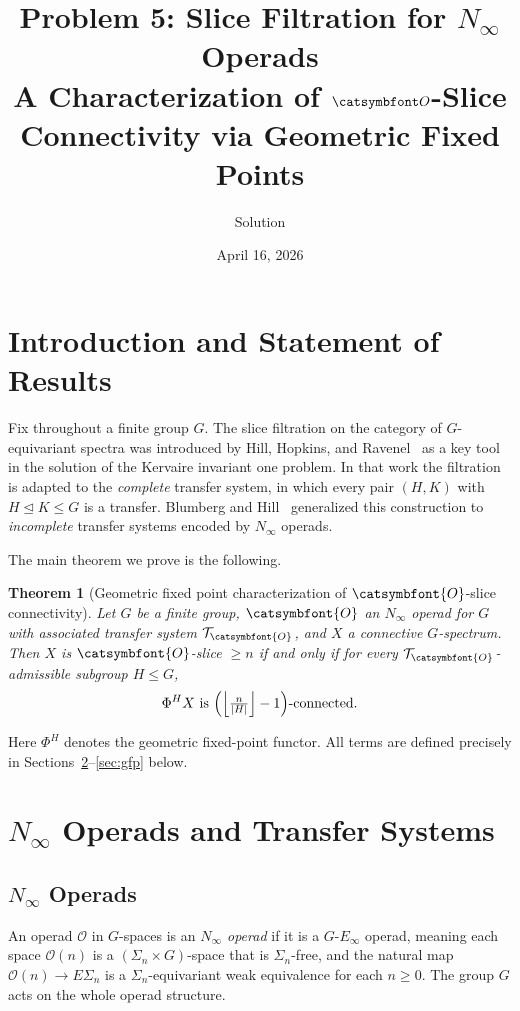 \documentclass[12pt]{article}
\title{Problem 5: Slice Filtration for $N_\infty$ Operads\\
\large A Characterization of $\aO$-Slice Connectivity via Geometric Fixed Points}
\author{Solution}
\date{April 16, 2026}
\newcommand{\aO}{{\catsymbfont{O}}}
\newcommand{\aT}{{\mathcal{T}}}
\newtheorem{theorem}{Theorem}
\theoremstyle{definition}
\begin{document}
\maketitle

\tableofcontents

\bigskip

\section{Introduction and Statement of Results}

Fix throughout a finite group $G$.  The slice filtration on the category of $G$-equivariant spectra was introduced by Hill, Hopkins, and Ravenel~\cite{HHR} as a key tool in the solution of the Kervaire invariant one problem.  In that work the filtration is adapted to the \emph{complete} transfer system, in which every pair $(H,K)$ with $H\trianglelefteq K\leq G$ is a transfer.  Blumberg and Hill~\cite{BlumbergHill} generalized this construction to \emph{incomplete} transfer systems encoded by $N_\infty$ operads.

The main theorem we prove is the following.

\begin{theorem}[Geometric fixed point characterization of $\aO$-slice connectivity]\label{thm:main}
Let $G$ be a finite group, $\aO$ an $N_\infty$ operad for $G$ with associated transfer system $\aT_\aO$, and $X$ a connective $G$-spectrum.  Then $X$ is $\aO$-slice $\geq n$ if and only if for every $\aT_\aO$-admissible subgroup $H\leq G$,
\[
   \Phi^H X \text{ is } \Bigl(\Bigl\lfloor \tfrac{n}{|H|} \Bigr\rfloor - 1\Bigr)\text{-connected.}
\]
\end{theorem}

Here $\Phi^H$ denotes the geometric fixed-point functor.  All terms are defined precisely in Sections~\ref{sec:transfers}--\ref{sec:gfp} below.

\section{$N_\infty$ Operads and Transfer Systems}\label{sec:transfers}

\subsection{$N_\infty$ Operads}

An operad $\mathcal{O}$ in $G$-spaces is an \emph{$N_\infty$ operad} if it is a $G$-$E_\infty$ operad, meaning each space $\mathcal{O}(n)$ is a $(\Sigma_n \times G)$-space that is $\Sigma_n$-free, and the natural map $\mathcal{O}(n) \to E\Sigma_n$ is a $\Sigma_n$-equivariant weak equivalence for each $n\geq 0$.  The group $G$ acts on the whole operad structure.
\end{document}
